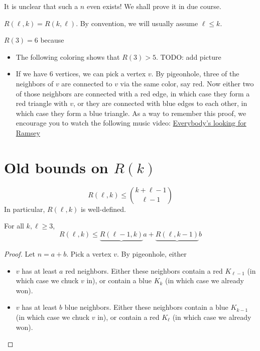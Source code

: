 \documentclass{article}
\begin{document}
It is unclear that such a $n$ even exists! We shall prove it in due course.

$R(\ell, k) = R(k, \ell)$. By convention, we will usually assume $\ell \le k$.

\begin{eg}
  $R(3) = 6$ because
  \begin{itemize}
    \item The following coloring shows that $R(3) > 5$. TODO: add picture
    \item If we have $6$ vertices, we can pick a vertex $v$. By pigeonhole, three of the neighbors of $v$ are connected to $v$ via the same color, say red. Now either two of those neighbors are connected with a red edge, in which case they form a red triangle with $v$, or they are connected with blue edges to each other, in which case they form a blue triangle. As a way to remember this proof, we encourage you to watch the following music video: \href{https://youtu.be/vE7MW2lk55E}{Everybody's looking for Ramsey}
  \end{itemize}
\end{eg}

\section{Old bounds on \texorpdfstring{$R(k)$}{R(k)}}

\begin{thm}
  $$R(\ell, k) \le \binom{k + \ell - 1}{\ell - 1}$$
  In particular, $R(\ell, k)$ is well-defined.
\end{thm}

\begin{lemma}
  For all $k, \ell \ge 3$,
  $$R(\ell, k) \le \underbrace{R(\ell - 1, k)}a + \underbrace{R(\ell, k - 1)}b$$
\end{lemma}
\begin{proof}
  Let $n = a + b$. Pick a vertex $v$. By pigeonhole, either
  \begin{itemize}
    \item $v$ has at least $a$ red neighbors. Either these neighbors contain a red $K_{\ell - 1}$ (in which case we chuck $v$ in), or contain a blue $K_k$ (in which case we already won).
    \item $v$ has at least $b$ blue neighbors. Either these neighbors contain a blue $K_{k - 1}$ (in which case we chuck $v$ in), or contain a red $K_\ell$ (in which case we already won).
  \end{itemize}
\end{proof}
\end{document}
